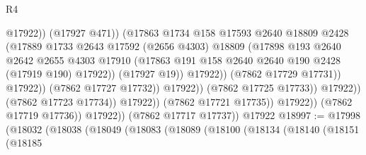 \begin{lexlean}{R4}
\begin{coremodule}
                                                  @17922))
                                              (@17927 @471))
                                            (@17863
                                              @1734
                                              @158
                                              @17593
                                              @2640
                                              @18809
                                              @2428
                                              (@17889
                                                @1733
                                                @2643
                                                @17592
                                                (@2656 @4303)
                                                @18809
                                                (@17898
                                                  @193
                                                  @2640
                                                  @2642
                                                  @2655
                                                  @4303
                                                  @17910
                                                  (@17863
                                                    @191
                                                    @158
                                                    @2640
                                                    @2640
                                                    @190
                                                    @2428
                                                    (@17919 @190)
                                                    @17922))
                                                (@17927 @19))
                                              @17922))
                                          (@7862 @17729 @17731))
                                        @17922))
                                    (@7862 @17727 @17732))
                                  @17922))
                              (@7862 @17725 @17733))
                            @17922))
                        (@7862 @17723 @17734))
                      @17922))
                  (@7862 @17721 @17735))
                @17922))
            (@7862 @17719 @17736))
          @17922))
      (@7862 @17717 @17737))
    @17922
@18997 := @17998
    (@18032
      (@18038
        (@18049
          (@18083
            (@18089
              (@18100
                (@18134
                  (@18140
                    (@18151
                      (@18185

\end{coremodule}
\end{lexlean}
